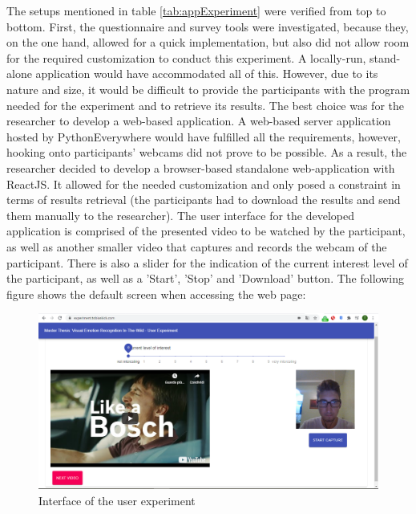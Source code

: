 The setups mentioned in table \ref{tab:appExperiment} were verified from top to bottom. First, the questionnaire and survey tools were investigated, because they, on the one hand, allowed for a quick implementation, but also did not allow room for the required customization to conduct this experiment. A locally-run, stand-alone application would have accommodated all of this. However, due to its nature and size, it would be difficult to provide the participants with the program needed for the experiment and to retrieve its results. The best choice was for the researcher to develop a web-based application.
\newline\newline
A web-based server application hosted by PythonEverywhere would have fulfilled all the requirements, however, hooking onto participants’ webcams did not prove to be possible. As a result, the researcher decided to develop a browser-based standalone web-application with ReactJS. It allowed for the needed customization and only posed a constraint in terms of results retrieval (the participants had to download the results and send them manually to the researcher).
\newline\newline
The user interface for the developed application is comprised of the presented video to be watched by the participant, as well as another smaller video that captures and records the webcam of the participant. There is also a slider for the indication of the current interest level of the participant, as well as a 'Start', 'Stop' and 'Download' button. The following figure shows the default screen when accessing the web page:

\begin{center}
\begin{figure}[H]
  \begin{center}
  \includegraphics[angle=0, width=1.0\textwidth]{Figures/UserExperiment.PNG}
  \caption{Interface of the user experiment}
  \label{fig:InterfaceUserExperiment}
  \end{center}
\end{figure}
\end{center}

